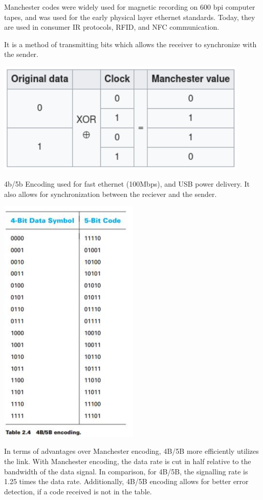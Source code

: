 Manchester codes were widely used for magnetic recording on 600 bpi computer
tapes, and was used for the early physical layer ethernet standards.
Today, they are used in consumer IR protocols, RFID, and NFC communication.

It is a method of transmitting bits which allows the receiver to synchronize
with the sender.\footnotemark



\includegraphics*[width=0.9\textwidth]{manchester.png}

4b/5b Encoding used for fast ethernet (100Mbps), and USB power delivery. It also
allows for synchronization between the reciever and the sender.\footnotemark
{}

\includegraphics*[width=0.5\textwidth]{4b5b.jpg}




In terms of advantages over Manchester encoding, 4B/5B more efficiently utilizes
the link. With Manchester encoding, the data rate is cut in half relative to the
bandwidth of the data signal.  In comparison, for 4B/5B, the signalling rate is
1.25 times the data rate. Additionally, 4B/5B encoding allows for better error
detection, if a code received is not in the table.
